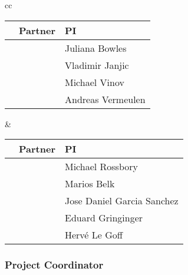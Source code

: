 \documentclass[a4paper,11pt]{article}
\begin{document}

\begin{center}
\begin{tabular}{cc}
\begin{tabular}{|l|l|l|}\hline
& \textbf{Partner} & \textbf{PI} \\ \hline
\addtocounter{partic}{1}
\thepartic & \participantshort{\thepartic} &  Juliana Bowles \\\hline
\addtocounter{partic}{1}
\thepartic & \participantshort{\thepartic} &  Vladimir Janjic \\\hline
\addtocounter{partic}{1}
\thepartic & \participantshort{\thepartic} &  Michael Vinov \\\hline
\addtocounter{partic}{1}
\thepartic & \participantshort{\thepartic} &  Andreas Vermeulen \\\hline
\end{tabular}
\quad\quad&\quad\quad
\begin{tabular}{|l|l|l|}\hline
& \textbf{Partner} & \textbf{PI} \\ \hline
\addtocounter{partic}{1}
\thepartic & \participantshort{\thepartic} & Michael Rossbory \\\hline
\addtocounter{partic}{1}
\thepartic & \participantshort{\thepartic} & Marios Belk \\\hline
\addtocounter{partic}{1}
\thepartic & \participantshort{\thepartic} & Jose Daniel Garcia Sanchez \\\hline
\addtocounter{partic}{1}
\thepartic & \participantshort{\thepartic} & Eduard Gringinger \\\hline
\addtocounter{partic}{1}
\thepartic & \participantshort{\thepartic} &  Herv\'e Le Goff \\\hline

\end{tabular}
\end{tabular}
\end{center}

\vspace{12pt}
\subsubsection*{Project Coordinator}
\vspace{-6pt}
\end{document}
